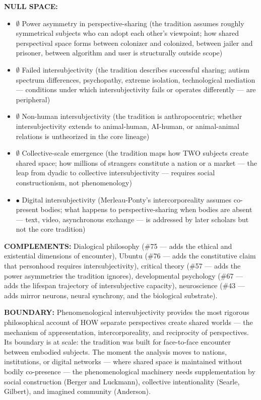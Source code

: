 \textbf{NULL SPACE:}

\begin{itemize}[nosep,leftmargin=*]
  \item $\emptyset$ Power asymmetry in perspective-sharing (the tradition assumes roughly symmetrical subjects who can adopt each other's viewpoint; how shared perspectival space forms between colonizer and colonized, between jailer and prisoner, between algorithm and user is structurally outside scope)
  \item $\emptyset$ Failed intersubjectivity (the tradition describes successful sharing; autism spectrum differences, psychopathy, extreme isolation, technological mediation — conditions under which intersubjectivity fails or operates differently — are peripheral)
  \item $\emptyset$ Non-human intersubjectivity (the tradition is anthropocentric; whether intersubjectivity extends to animal-human, AI-human, or animal-animal relations is untheorized in the core lineage)
  \item $\emptyset$ Collective-scale emergence (the tradition maps how TWO subjects create shared space; how millions of strangers constitute a nation or a market — the leap from dyadic to collective intersubjectivity — requires social constructionism, not phenomenology)
  \item $\bullet$ Digital intersubjectivity (Merleau-Ponty's intercorporeality assumes co-present bodies; what happens to perspective-sharing when bodies are absent — text, video, asynchronous exchange — is addressed by later scholars but not the core tradition)
\end{itemize}


\textbf{COMPLEMENTS:} Dialogical philosophy (\#75 — adds the ethical and existential dimensions of encounter), Ubuntu (\#76 — adds the constitutive claim that personhood requires intersubjectivity), critical theory (\#57 — adds the power asymmetries the tradition ignores), developmental psychology (\#67 — adds the lifespan trajectory of intersubjective capacity), neuroscience (\#43 — adds mirror neurons, neural synchrony, and the biological substrate).


\textbf{BOUNDARY:} Phenomenological intersubjectivity provides the most rigorous philosophical account of HOW separate perspectives create shared worlds — the mechanism of appresentation, intercorporeality, and reciprocity of perspectives. Its boundary is at scale: the tradition was built for face-to-face encounter between embodied subjects. The moment the analysis moves to nations, institutions, or digital networks — where shared space is maintained without bodily co-presence — the phenomenological machinery needs supplementation by social construction (Berger and Luckmann), collective intentionality (Searle, Gilbert), and imagined community (Anderson).


